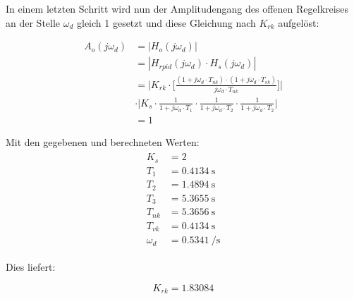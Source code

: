 In einem letzten Schritt wird  nun der Amplitudengang des offenen Regelkreises
an der  Stelle $\omega_d$ gleich 1  gesetzt und diese Gleichung  nach $K_{rk}$
aufgel\"ost:

\begin{equation} \label{eq:pid:h_o_k_rk_one}
    \begin{split}
        A_{o}(j\omega_d)    & = | H_{o}(j\omega_d) |                            \\
                            & = | H_{rpid}(j\omega_d) \cdot H_s(j\omega_d) |    \\
                            & = \Biggl \rvert
                                    K_{rk}
                                    \cdot
                                    \biggl[ \frac{(1 + j\omega_d \cdot T_{nk}) \cdot (1 + j\omega_d \cdot T_{vk}) }{ j\omega_d \cdot T_{nk} } \biggr] \Biggr \rvert \\
                            & \cdot
                                \Biggl \rvert
                                    K_s
                                    \cdot \frac{1}{1 + j\omega_d \cdot T_1}
                                    \cdot \frac{1}{1 + j\omega_d \cdot T_2}
                                    \cdot \frac{1}{1 + j\omega_d \cdot T_2}
                                    \Biggr \rvert \\
                            & = 1
    \end{split}
\end{equation}

Mit den gegebenen und berechneten Werten:
\begin{gather} \label{eq:pid:h_o_k_rk_one}
    \begin{split}
        K_s         & = 2                        \\
        T_1         & = \SI{0.4134}{\second}     \\
        T_2         & = \SI{1.4894}{\second}     \\
        T_3         & = \SI{5.3655}{\second}     \\
        T_{nk}      & = \SI{5.3656}{\second}     \\
        T_{vk}      & = \SI{0.4134}{\second}     \\
        \omega_d    & = \SI{0.5341}{\per\second}
    \end{split}
\end{gather}

Dies liefert:

\begin{equation} \label{eq:pid:k_rk_result}
    K_{rk} = 1.83084
\end{equation}


